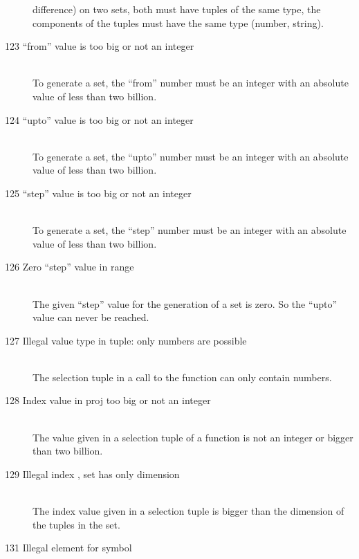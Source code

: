 \begin{description}
   difference) on two sets, 
   both must have tuples of the same type,\ie
   the components of the tuples must have the same type (number,
   string).
\item[123 ``from'' value \code{xxx} is too big or not an
   integer]\ \\
   To generate a set, the ``from'' number must be an integer with an
   absolute value of less than two billion.
\item[124 ``upto'' value \code{xxx} is too big or not an
   integer]\ \\
   To generate a set, the ``upto'' number must be an integer with an
   absolute value of less than two billion.
\item[125 ``step'' value \code{xxx} is too big or not an
   integer]\ \\
   To generate a set, the ``step'' number must be an integer with an
   absolute value of less than two billion.
\item[126 Zero ``step'' value in range]\ \\
   The given ``step'' value for the generation of a set is
   zero. So the ``upto'' value can never be reached. 
\item[127 Illegal value type in tuple: \code{xxx} only numbers are
   possible]\ \\
   The selection tuple in a call to the  function can
   only contain numbers.
\item[128 Index value \code{xxx} in proj too big or not an integer]\ \\
   The value given in a selection tuple of a  function is
   not an integer or bigger than two billion.
\item[129 Illegal index \code{xxx}, set has only dimension
   \code{yyy}]\ \\
   The index value given in a selection tuple is bigger than the
   dimension of the tuples in the set.
\item[131 Illegal element \code{xxx} for symbol]\ \\

\end{description}
